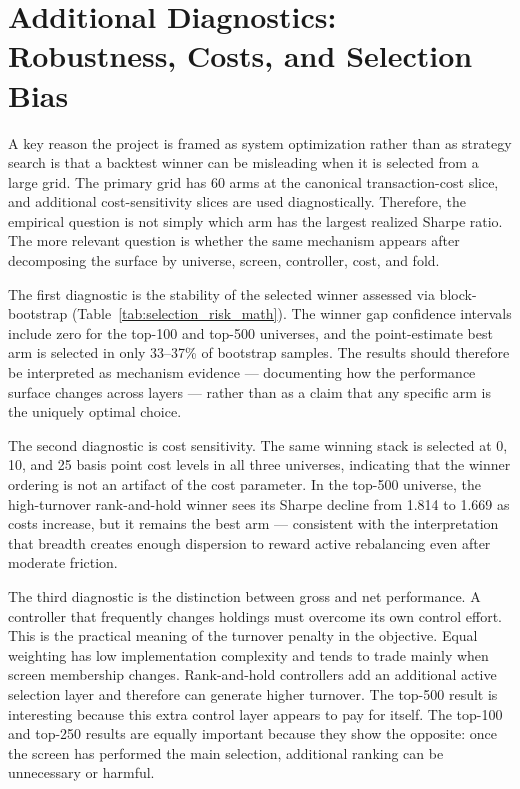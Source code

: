 \documentclass[journal,10pt]{IEEEtran}
\begin{document}
\section{Additional Diagnostics: Robustness, Costs, and Selection Bias}
A key reason the project is framed as system optimization rather than as strategy search is that a backtest winner can be misleading when it is selected from a large grid. The primary grid has 60 arms at the canonical transaction-cost slice, and additional cost-sensitivity slices are used diagnostically. Therefore, the empirical question is not simply which arm has the largest realized Sharpe ratio. The more relevant question is whether the same mechanism appears after decomposing the surface by universe, screen, controller, cost, and fold.

The first diagnostic is the stability of the selected winner assessed via block-bootstrap (Table~\ref{tab:selection_risk_math}). The winner gap confidence intervals include zero for the top-100 and top-500 universes, and the point-estimate best arm is selected in only 33--37\% of bootstrap samples. The results should therefore be interpreted as mechanism evidence — documenting how the performance surface changes across layers — rather than as a claim that any specific arm is the uniquely optimal choice.

The second diagnostic is cost sensitivity. The same winning stack is selected at 0, 10, and 25 basis point cost levels in all three universes, indicating that the winner ordering is not an artifact of the cost parameter. In the top-500 universe, the high-turnover rank-and-hold winner sees its Sharpe decline from 1.814 to 1.669 as costs increase, but it remains the best arm — consistent with the interpretation that breadth creates enough dispersion to reward active rebalancing even after moderate friction.

The third diagnostic is the distinction between gross and net performance. A controller that frequently changes holdings must overcome its own control effort. This is the practical meaning of the turnover penalty in the objective. Equal weighting has low implementation complexity and tends to trade mainly when screen membership changes. Rank-and-hold controllers add an additional active selection layer and therefore can generate higher turnover. The top-500 result is interesting because this extra control layer appears to pay for itself. The top-100 and top-250 results are equally important because they show the opposite: once the screen has performed the main selection, additional ranking can be unnecessary or harmful.
\end{document}
